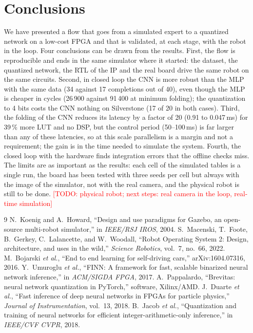 \documentclass{article}
\newcommand{\TODO}[1]{\textcolor{red}{[TODO: #1]}}
\begin{document}
\section{Conclusions}
\label{sec:concl}
We have presented a flow that goes from a simulated expert to a quantized network on a low-cost FPGA and that is validated, at each stage, with the robot in the loop.
Four conclusions can be drawn from the results.
First, the flow is reproducible and ends in the same simulator where it started: the dataset, the quantized network, the RTL of the IP and the real board drive the same robot on the same circuits.
Second, in closed loop the CNN is more robust than the MLP with the same data (34 against 17 completions out of 40), even though the MLP is cheaper in cycles (26\,900 against 91\,400 at minimum folding);
the quantization to 4 bits costs the CNN nothing on Silverstone (17 of 20 in both cases).
Third, the folding of the CNN reduces its latency by a factor of 20 (0.91 to 0.047\,ms) for 39\,\% more LUT and no DSP, but the control period (50--100\,ms) is far larger than any of these latencies, so
at this scale parallelism is a margin and not a requirement; the gain is in the time needed to simulate the system.
Fourth, the closed loop with the hardware finds integration errors that the offline checks miss.
The limits are as important as the results: each cell of the simulated tables is a single run, the board has been tested with three seeds per cell but always with the image of the simulator, not with the real camera, and the physical robot is still to be done.
\TODO{physical robot; next steps: real camera in the loop, real-time simulation}

\begin{thebibliography}{9}
 N.~Koenig and A.~Howard, ``Design and use paradigms for Gazebo, an open-source multi-robot simulator,'' in \emph{IEEE/RSJ IROS}, 2004.
 S.~Macenski, T.~Foote, B.~Gerkey, C.~Lalancette, and W.~Woodall, ``Robot Operating System 2: Design, architecture, and uses in the wild,'' \emph{Science Robotics}, vol.~7, no.~66, 2022.
 M.~Bojarski \emph{et al.}, ``End to end learning for self-driving cars,'' arXiv:1604.07316, 2016.
 Y.~Umuroglu \emph{et al.}, ``FINN: A framework for fast, scalable binarized neural network inference,'' in \emph{ACM/SIGDA FPGA}, 2017.
 A.~Pappalardo, ``Brevitas: neural network quantization in PyTorch,'' software, Xilinx/AMD.
 J.~Duarte \emph{et al.}, ``Fast inference of deep neural networks in FPGAs for particle physics,'' \emph{Journal of Instrumentation}, vol.~13, 2018.
 B.~Jacob \emph{et al.}, ``Quantization and training of neural networks for efficient integer-arithmetic-only inference,'' in \emph{IEEE/CVF CVPR}, 2018.
\end{thebibliography}
\end{document}
